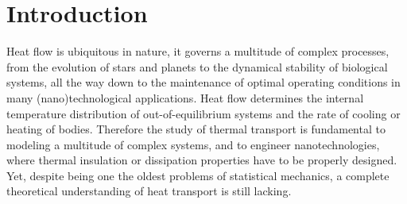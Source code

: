 \chapter{Introduction}  \label{ch:intro}

\vspace{1cm}
\nocite{Ercole2016,Ercole2017,Baroni2018,Bertossa2018}

Heat flow is ubiquitous in nature, it governs a multitude of complex processes, from the evolution of stars and planets to the dynamical stability of biological systems, all the way down to the maintenance of optimal operating conditions in many (nano)technological applications. 
Heat flow determines the internal temperature distribution of out-of-equilibrium systems and the rate of cooling or heating of bodies. 
Therefore the study of thermal transport is fundamental to modeling a multitude of complex systems, and to engineer nanotechnologies, where thermal insulation or dissipation properties have to be properly designed. 
Yet, despite being one the oldest problems of statistical mechanics, a complete theoretical understanding of heat transport is still lacking. 

